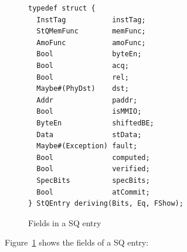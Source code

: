 \begin{figure}
\begin{lstlisting}[caption={}]
typedef struct {
  InstTag           instTag;
  StQMemFunc        memFunc;
  AmoFunc           amoFunc;
  Bool              byteEn;
  Bool              acq;
  Bool              rel;
  Maybe#(PhyDst)    dst;
  Addr              paddr;
  Bool              isMMIO;
  ByteEn            shiftedBE;
  Data              stData;
  Maybe#(Exception) fault;
  Bool              computed;
  Bool              verified;
  SpecBits          specBits;
  Bool              atCommit;
} StQEntry deriving(Bits, Eq, FShow);
\end{lstlisting}
\caption{Fields in a SQ entry}\label{fig:sq-entry}
\end{figure}

Figure~\ref{fig:sq-entry} shows the fields of a SQ entry:
